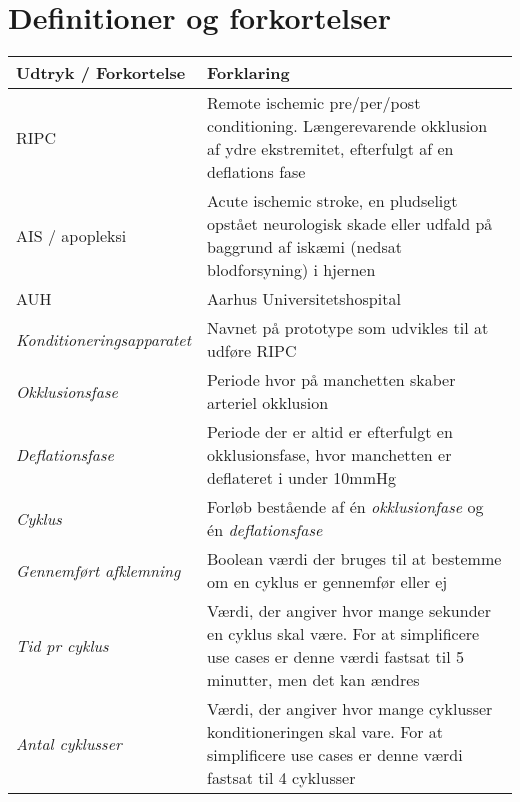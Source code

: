 	\section{Definitioner og forkortelser}
	\begin{longtable}{ |p{} |p{}| } 
		\hline
		\textbf{Udtryk / Forkortelse} &  \textbf{Forklaring} \\
		\hline
		RIPC & Remote ischemic pre/per/post conditioning. Længerevarende okklusion af ydre ekstremitet, efterfulgt af en deflations fase\\
		\hline
		AIS / apopleksi & Acute ischemic stroke, en pludseligt opstået neurologisk skade eller udfald på baggrund af iskæmi (nedsat blodforsyning) i hjernen \\
		\hline
		AUH & Aarhus Universitetshospital \\
		\hline
		\textit{Konditioneringsapparatet} & Navnet på prototype som udvikles til at udføre RIPC \\
		\hline
		\textit{Okklusionsfase} & Periode hvor på manchetten skaber arteriel okklusion \\
		\hline
		\textit{Deflationsfase} & Periode der er altid er efterfulgt en okklusionsfase, hvor manchetten er deflateret i under 10mmHg\\
		\hline
		\textit{Cyklus} & Forløb bestående af én \textit{okklusionfase} og én \textit{deflationsfase} \\
		\hline
		\textit{Gennemført afklemning} & Boolean værdi der bruges til at bestemme om en cyklus er gennemfør eller ej \\
		\hline
		\textit{Tid pr cyklus} & Værdi, der angiver hvor mange sekunder en cyklus skal være. For at simplificere use cases er denne værdi fastsat til 5 minutter, men det kan ændres \\
		\hline
		\textit{Antal cyklusser} & Værdi, der angiver hvor mange cyklusser konditioneringen skal vare. For at simplificere use cases er denne værdi fastsat til 4 cyklusser \\
		\hline
	\end{longtable}
	
